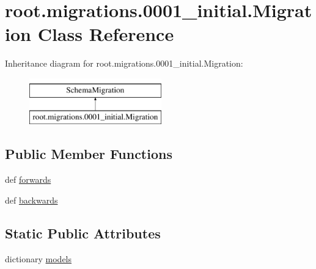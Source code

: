 \hypertarget{classroot_1_1migrations_1_10001__initial_1_1_migration}{\section{root.\-migrations.0001\-\_\-initial.Migration Class Reference}
\label{classroot_1_1migrations_1_10001__initial_1_1_migration}
}
Inheritance diagram for root.\-migrations.0001\-\_\-initial.Migration\-:\begin{figure}[H]
\begin{center}
\leavevmode
\includegraphics[height=2.000000cm]{classroot_1_1migrations_1_10001__initial_1_1_migration}
\end{center}
\end{figure}
\subsection*{Public Member Functions}
\begin{DoxyCompactItemize}
\item 
def \hyperlink{classroot_1_1migrations_1_10001__initial_1_1_migration_a41ecac65c20e8b8f48d7b847c7086ea2}{forwards}
\item 
def \hyperlink{classroot_1_1migrations_1_10001__initial_1_1_migration_abc0510471524dc0a83bdd5424529e50b}{backwards}
\end{DoxyCompactItemize}
\subsection*{Static Public Attributes}
\begin{DoxyCompactItemize}
\item 
dictionary \hyperlink{classroot_1_1migrations_1_10001__initial_1_1_migration_ac9f282ca5eb3697057ec3c78480c77d7}{models}
\end{DoxyCompactItemize}


